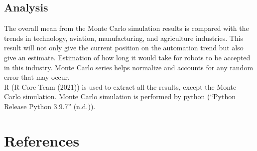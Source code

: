 \documentclass[
  english,
  man]{apa7}
\begin{document}
\hypertarget{analysis}{%
\subsection{Analysis}\label{analysis}}

The overall mean from the Monte Carlo simulation results is compared with the trends in technology, aviation, manufacturing, and agriculture industries. This result will not only give the current position on the automation trend but also give an estimate. Estimation of how long it would take for robots to be accepted in this industry. Monte Carlo series helps normalize and accounts for any random error that may occur.\\
R (R Core Team (2021)) is used to extract all the results, except the Monte Carlo simulation. Monte Carlo simulation is performed by python ({``Python Release Python 3.9.7''} (n.d.)).

\newpage

\hypertarget{references}{%
\section{References}\label{references}}

\begingroup
\setlength{\parindent}{-0.5in}
\setlength{\leftskip}{0.5in}
\end{document}
